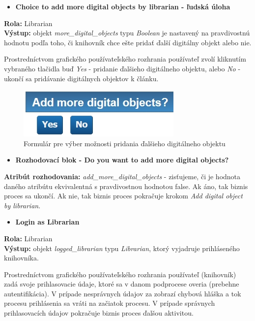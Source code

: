 \documentclass[10pt,oneside,slovak,a4paper]{article}
\begin{document}
\begin{itemize}
\item \textbf{Choice to add more digital objects by librarian
 - ľudská úloha}
\end{itemize}

\textbf{Rola:} Librarian\\
\textbf{Výstup:} objekt \textit{more\_digital\_objects} typu \textit{Boolean} je nastavený na pravdivostnú hodnotu podľa toho, či knihovník chce ešte pridať ďalší digitálny objekt alebo nie.

Prostredníctvom grafického používateľského rozhrania používateľ zvolí kliknutím vybraného tlačidla buď \textit{Yes} - pridanie ďalšieho digitálneho objektu, alebo \textit{No} - ukončí sa pridávanie digitálnych objektov k článku.

\begin{figure} [H]
\centering
\includegraphics[scale=0.4]{forms/formDigitalObjects.jpg} 
\caption{Formulár pre výber možnosti pridania ďalšieho digitálneho objektu}
\end{figure}

\begin{itemize}
\item \textbf{Rozhodovací blok - Do you want to add more digital objects?}
\end{itemize}

\textbf{Atribút rozhodovania:} \textit{add\_more\_digital\_objects} - zisťujeme, či je hodnota daného atribútu ekvivalentná s pravdivostnou hodnotou false. Ak áno, tak biznis proces sa ukončí. Ak nie, tak biznis proces pokračuje krokom \textit{Add digital object by librarian}.



\begin{itemize}
\item \textbf{Login as Librarian}
\end{itemize}

\textbf{Rola:} Librarian\\
\textbf{Výstup:} objekt \textit{logged\_librarian} typu \textit{Librarian}, ktorý vyjadruje prihláseného knihovníka.

Prostredníctvom grafického používateľského rozhrania používateľ (knihovník) zadá svoje prihlasovacie údaje, ktoré sa v danom podprocese overia (prebehne autentifikácia). V prípade nesprávnych údajov za zobrazí chybová hláška a tok procesu prihlásenia sa vráti na začiatok procesu. V prípade správnych prihlasovacích údajov pokračuje biznis proces ďalšou aktivitou.
\end{document}
